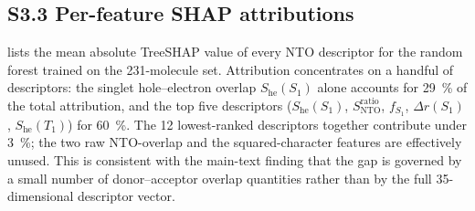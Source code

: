 \documentclass[twoside,twocolumn,9pt]{extarticle}
\begin{document}
\subsection*{S3.3 Per-feature SHAP attributions}
 lists the mean absolute TreeSHAP value of every NTO descriptor for
the random forest trained on the \num{231}-molecule set. Attribution concentrates
on a handful of descriptors: the singlet hole--electron overlap $S_\text{he}(S_1)$
alone accounts for \qty{29}{\percent} of the total attribution, and the top five
descriptors ($S_\text{he}(S_1)$, $S_\text{NTO}^{\text{ratio}}$, $f_{S_1}$,
$\Delta r(S_1)$, $S_\text{he}(T_1)$) for \qty{60}{\percent}. The \num{12}
lowest-ranked descriptors together contribute under \qty{3}{\percent}; the two
raw NTO-overlap and the squared-character features are effectively unused. This is
consistent with the main-text finding that the gap is governed by a small number
of donor--acceptor overlap quantities rather than by the full \num{35}-dimensional
descriptor vector.
\end{document}
